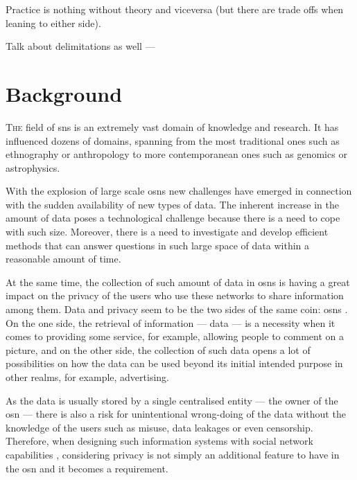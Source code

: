 \documentclass[showtrims,oldfontcommands]{kthesis}
\begin{document}
Practice is nothing without theory and viceversa (but there are trade offs when leaning to either side).

Talk about delimitations as well
---

\chapter{Background}
\lettrine{\textcolor[gray]{.25}{T}}{he} field of \acp{sn} is an extremely vast domain of knowledge and research. It 
has influenced dozens of domains, spanning from the most traditional ones such as 
ethnography or anthropology to more contemporanean ones such as genomics or astrophysics.


With the explosion of large scale \acp{osn} new challenges have emerged in connection 
with the sudden availability of new types of data. The inherent increase in the 
amount of data poses a technological challenge because there is a need to cope with 
such size. Moreover, there is a need to investigate and develop efficient methods 
that can answer questions in such large space of data within a reasonable amount 
of time.

At the same time, the collection of such amount of data in \acp{osn} is having a great 
impact on the privacy of the users who use these networks to share information among 
them. Data and privacy seem to be the two sides of the same coin: \acp{osn} \cite{BelkinC92}. 
On the one side, the retrieval of information --- data --- is 
a necessity when it comes to providing some service, for example, allowing people 
to comment on a picture, and on the other side, the collection of such data opens 
a lot of possibilities on how the data can be used beyond its initial intended purpose 
in other realms, for example, advertising.

As the data is usually stored by a single centralised entity --- the owner of the 
\ac{osn} --- there is also a risk for unintentional wrong-doing of the data without 
the knowledge of the users such as misuse, data leakages or even censorship. Therefore, 
when designing such information systems with social network capabilities \cite{Abrams06, Lunt06, Lunt07, Zhu08, Lunt09}, 
considering privacy is not simply an additional feature to have in the \ac{osn} 
and it becomes a requirement. 
\end{document}
